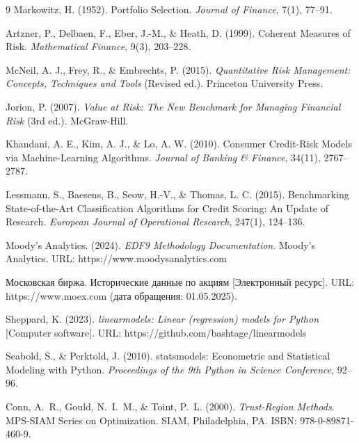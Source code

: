 \documentclass[]{article}
\begin{document}
\begin{thebibliography}{9}
		Markowitz, H. (1952). Portfolio Selection. \textit{Journal of Finance}, 7(1), 77–91.

		Artzner, P., Delbaen, F., Eber, J.-M., \& Heath, D. (1999). Coherent Measures of Risk. \textit{Mathematical Finance}, 9(3), 203–228.

		McNeil, A. J., Frey, R., \& Embrechts, P. (2015). \textit{Quantitative Risk Management: Concepts, Techniques and Tools} (Revised ed.). Princeton University Press.

		Jorion, P. (2007). \textit{Value at Risk: The New Benchmark for Managing Financial Risk} (3rd ed.). McGraw-Hill.

		Khandani, A. E., Kim, A. J., \& Lo, A. W. (2010). Consumer Credit-Risk Models via Machine-Learning Algorithms. \textit{Journal of Banking \& Finance}, 34(11), 2767–2787.

		Lessmann, S., Baesens, B., Seow, H.-V., \& Thomas, L. C. (2015). Benchmarking State-of-the-Art Classification Algorithms for Credit Scoring: An Update of Research. \textit{European Journal of Operational Research}, 247(1), 124–136.

		Moody's Analytics. (2024). \textit{EDF9 Methodology Documentation}. Moody's Analytics. URL: https://www.moodysanalytics.com

		Московская биржа. Исторические данные по акциям [Электронный ресурс]. URL: https://www.moex.com (дата обращения: 01.05.2025).

		Sheppard, K. (2023). \textit{linearmodels: Linear (regression) models for Python} [Computer software]. URL: https://github.com/bashtage/linearmodels

		Seabold, S., \& Perktold, J. (2010). statsmodels: Econometric and Statistical Modeling with Python. \textit{Proceedings of the 9th Python in Science Conference}, 92–96.

		Conn, A.~R., Gould, N.~I.~M., \& Toint, P.~L. (2000). \textit{Trust-Region Methods}. MPS-SIAM Series on Optimization. SIAM, Philadelphia, PA. ISBN: 978-0-89871-460-9.

	\end{thebibliography}

	\newpage
	\appendix
	\renewcommand{\thesection}{}
\end{document}
